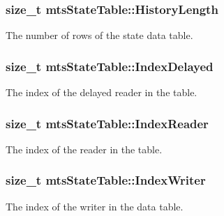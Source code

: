 \subsubsection[{History\+Length}]{\setlength{\rightskip}{0pt plus 5cm}size\+\_\+t mts\+State\+Table\+::\+History\+Length\hspace{0.3cm}{\ttfamily [protected]}}\label{classmts_state_table_a922d394133217df6961407a890d21913}
The number of rows of the state data table. \hypertarget{classmts_state_table_a21a94033326261d2aa69dec1e7000aea}{}
\subsubsection[{Index\+Delayed}]{\setlength{\rightskip}{0pt plus 5cm}size\+\_\+t mts\+State\+Table\+::\+Index\+Delayed\hspace{0.3cm}{\ttfamily [protected]}}\label{classmts_state_table_a21a94033326261d2aa69dec1e7000aea}
The index of the delayed reader in the table. \hypertarget{classmts_state_table_a3735ec3378d9461a2a57028ec0e8aa70}{}
\subsubsection[{Index\+Reader}]{\setlength{\rightskip}{0pt plus 5cm}size\+\_\+t mts\+State\+Table\+::\+Index\+Reader\hspace{0.3cm}{\ttfamily [protected]}}\label{classmts_state_table_a3735ec3378d9461a2a57028ec0e8aa70}
The index of the reader in the table. \hypertarget{classmts_state_table_aec4f467171255f1898ec74f78f90a901}{}
\subsubsection[{Index\+Writer}]{\setlength{\rightskip}{0pt plus 5cm}size\+\_\+t mts\+State\+Table\+::\+Index\+Writer\hspace{0.3cm}{\ttfamily [protected]}}\label{classmts_state_table_aec4f467171255f1898ec74f78f90a901}
The index of the writer in the data table. \hypertarget{classmts_state_table_ad526708a4622c8cc4d9398bdb6b9ad5e}{}

